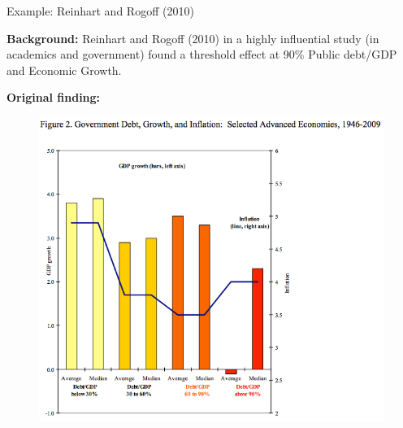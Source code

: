 \documentclass[10pt]{beamer}
\begin{document}
\begin{frame}{Example: Reinhart and Rogoff (2010)}

    \textbf{Background:} Reinhart and Rogoff (2010) in a highly influential study (in academics and government) found a threshold effect at 90\% Public debt/GDP and Economic Growth.

    \textbf{Original finding:}

    \begin{figure}
        \includegraphics[scale=0.3]{img/rr_original.png}
    \end{figure}


\end{frame}
\end{document}
